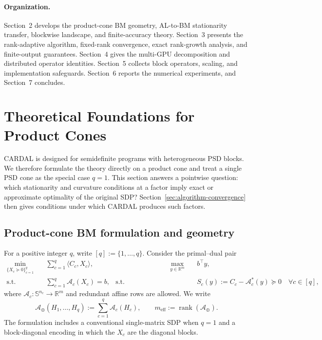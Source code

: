 \documentclass[11pt]{article}
\theoremstyle{definition}
\theoremstyle{remark}
\begin{document}
\paragraph{Organization.}
Section~2 develops the product-cone BM geometry, AL-to-BM stationarity
transfer, blockwise landscape, and finite-accuracy theory.  Section~3
presents the rank-adaptive algorithm, fixed-rank convergence, exact
rank-growth analysis, and finite-output guarantees.
Section~4 gives the multi-GPU decomposition and distributed operator
identities.  Section~5 collects block operators, scaling, and implementation
safeguards.  Section~6
reports the numerical experiments, and Section~7 concludes.

%
\section{Theoretical Foundations for Product Cones}
\label{sec:theoretical-foundations}

CARDAL is designed for semidefinite programs with heterogeneous PSD blocks.
We therefore formulate the theory directly on a product cone and treat a
single PSD cone as the special case $q=1$.  This section answers a pointwise
question: which stationarity and curvature conditions at a factor imply exact
or approximate optimality of the original SDP?  Section~\ref{sec:algorithm-convergence}
then gives conditions under which CARDAL produces such factors.

\subsection{Product-cone BM formulation and geometry}
\label{subsec:bm-landscape}

For a positive integer $q$, write $[q]:=\{1,\ldots,q\}$.
Consider the primal--dual pair
\begin{equation}
\begin{aligned}
  \min_{\{X_c\succeq0\}_{c=1}^q}\quad
  &\sum_{c=1}^q\langle C_c,X_c\rangle,
  &\qquad \qquad  \qquad \qquad
  \max_{y\in\mathbb R^m}\quad
  &b^\top y,\\
  \text{s.t.}\quad
  &\sum_{c=1}^q\mathcal A_c(X_c)=b,
  &
  \text{s.t.}\quad
  &S_c(y):=C_c-\mathcal A_c^*(y)\succeq0
    \quad \forall c\in[q],
\end{aligned}
\label{eq:product-sdp-theory}
\end{equation}
where $\mathcal A_c:\mathbb S^{n_c}\to\mathbb R^m$ and redundant affine
rows are allowed.  We write
\[
  \mathcal A_\oplus(H_1,\ldots,H_q)
  :=\sum_{c=1}^q\mathcal A_c(H_c),
  \qquad
  m_{\mathrm{eff}}:=\operatorname{rank}(\mathcal A_\oplus).
\]
The formulation includes a conventional single-matrix SDP when $q=1$ and a
block-diagonal encoding in which the $X_c$ are the diagonal blocks.
\end{document}
